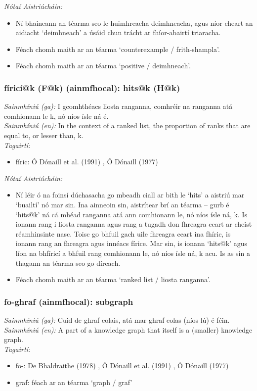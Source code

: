  \noindent \textit{Nótaí Aistriúcháin:}
\begin{itemize}
	\item Ní bhaineann an téarma seo le huimhreacha deimhneacha, agus níor cheart an aidiacht `deimhneach' a úsáid chun trácht ar fhíor-abairtí triaracha.
	\item Féach chomh maith ar an téarma `counterexample / frith-shampla'.
	\item Féach chomh maith ar an téarma `positive / deimhneach'.
\end{itemize}


\subsubsection*{fíricí@k (F@k) (ainmfhocal): hits@k (H@k)}
 \noindent \textit{Sainmhíniú (ga):} I gcomhthéacs liosta ranganna, comhréir na ranganna atá comhionann le k, nó níos ísle ná é.
\\
 \noindent \textit{Sainmhíniú (en):} In the context of a ranked list, the proportion of ranks that are equal to, or lesser than, k.
\\
 \noindent \textit{Tagairtí:}
\begin{itemize}
	\item fíric: Ó Dónaill et al. (1991) \cite{focloir-beag}, Ó Dónaill (1977) \cite{odonaill}
\end{itemize}

 \noindent \textit{Nótaí Aistriúcháin:}
\begin{itemize}
	\item Ní léir ó na foinsí dúchasacha go mbeadh ciall ar bith le `hits' a aistriú mar `buailtí' nó mar sin. Ina ainneoin sin, aistrítear brí an téarma -- gurb é `hits@k' ná cá mhéad ranganna atá ann comhionann le, nó níos ísle ná, k. Is ionann rang i liosta ranganna agus rang a tugadh don fhreagra ceart ar cheist réamhinsinte nasc. Toisc go bhfuil gach uile fhreagra ceart ina fhíric, is ionann rang an fhreagra agus innéacs fírice. Mar sin, is ionann `hits@k' agus líon na bhfíricí a bhfuil rang comhionann le, nó níos ísle ná, k acu. Is as sin a thagann an téarma seo go díreach.
	\item Féach chomh maith ar an téarma `ranked list / liosta ranganna'.
\end{itemize}


\subsubsection*{fo-ghraf (ainmfhocal): subgraph}
 \noindent \textit{Sainmhíniú (ga):} Cuid de ghraf eolais, atá mar ghraf eolas (níos lú) é féin.
\\
 \noindent \textit{Sainmhíniú (en):} A part of a knowledge graph that itself is a (smaller) knowledge graph.
\\
 \noindent \textit{Tagairtí:}
\begin{itemize}
	\item fo-: De Bhaldraithe (1978) \cite{de-bhaldraithe}, Ó Dónaill et al. (1991) \cite{focloir-beag}, Ó Dónaill (1977) \cite{odonaill}
	\item graf: féach ar an téarma `graph / graf'
\end{itemize}

